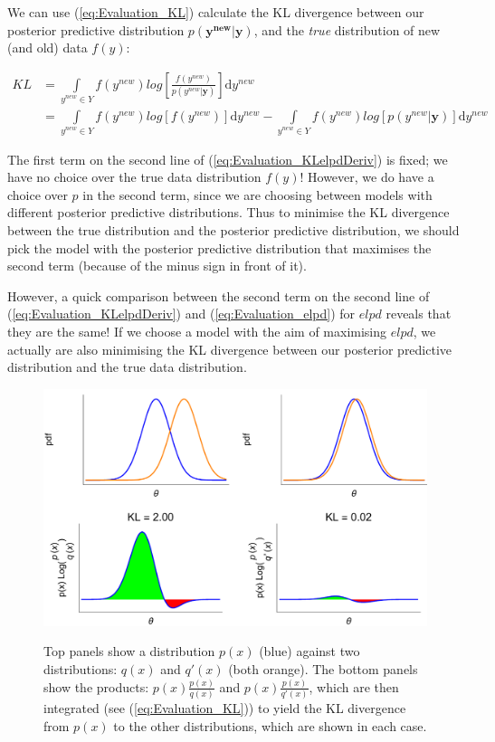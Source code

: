 \documentclass[11pt,fullpage]{book}
\begin{document}
We can use (\ref{eq:Evaluation_KL}) calculate the KL divergence between our posterior predictive distribution $p(\boldsymbol{y^{new}}|\boldsymbol{y})$, and the \textit{true} distribution of new (and old) data $f(y)$:

\begin{equation}\label{eq:Evaluation_KLelpdDeriv}
\begin{align}
KL &= \int\limits_{y^{new}\in Y} f(y^{new}) log\left[\frac{f(y^{new})}{p(y^{new}|\boldsymbol{y})}\right]\mathrm{d}y^{new}\\
&= \int\limits_{y^{new}\in Y} f(y^{new}) log\left[f(y^{new})\right]\mathrm{d}y^{new} - \int\limits_{y^{new}\in Y} f(y^{new}) log\left[p(y^{new}|\boldsymbol{y})\right]\mathrm{d}y^{new}
\end{align}
\end{equation}

The first term on the second line of (\ref{eq:Evaluation_KLelpdDeriv}) is fixed; we have no choice over the true data distribution $f(y)$! However, we do have a choice over $p$ in the second term, since we are choosing between models with different posterior predictive distributions. Thus to minimise the KL divergence between the true distribution and the posterior predictive distribution, we should pick the model with the posterior predictive distribution that maximises the second term (because of the minus sign in front of it). 

However, a quick comparison between the second term on the second line of (\ref{eq:Evaluation_KLelpdDeriv}) and (\ref{eq:Evaluation_elpd}) for $elpd$ reveals that they are the same! If we choose a model with the aim of maximising $elpd$, we actually are also minimising the KL divergence between our posterior predictive distribution and the true data distribution.

\begin{figure}
\centering
\scalebox{0.5} 
{\includegraphics{Evaluation_KLDivergence.pdf}}
\caption{Top panels show a distribution $p(x)$ (blue) against two distributions: $q(x)$ and $q'(x)$ (both orange). The bottom panels show the products: $p(x)\frac{p(x)}{q(x)}$ and $p(x)\frac{p(x)}{q'(x)}$, which are then integrated (see (\ref{eq:Evaluation_KL})) to yield the KL divergence from $p(x)$ to the other distributions, which are shown in each case.}\label{fig:Evaluation_KLDivergence}
\end{figure}
\end{document}
